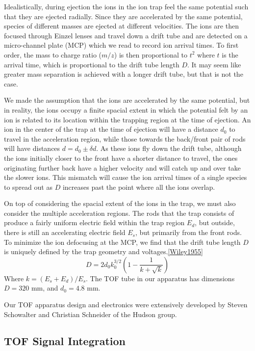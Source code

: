 Idealistically, during ejection the ions in the ion trap feel the same potential such that they are ejected radially. Since they are accelerated by the same potential, species of different masses are ejected at different velocities. The ions are then focused through Einzel lenses and travel down a drift tube and are detected on a micro-channel plate (MCP) which we read to record ion arrival times. To first order, the mass to charge ratio ($m/z$) is then proportional to $t^2$ where $t$ is the arrival time, which is proportional to the drift tube length $D$. It may seem like greater mass separation is achieved with a longer drift tube, but that is not the case.

We made the assumption that the ions are accelerated by the same potential, but in reality, the ions occupy a finite spacial extent in which the potential felt by an ion is related to its location within the trapping region at the time of ejection. An ion in the center of the trap at the time of ejection will have a distance $d_0$ to travel in the acceleration region, while those towards the back/front pair of rods will have distances $d=d_0\pm \delta d$. As these ions fly down the drift tube, although the ions initially closer to the front have a shorter distance to travel, the ones originating further back have a higher velocity and will catch up and over take the slower ions. This mismatch will cause the ion arrival times of a single species to spread out as $D$ increases past the point where all the ions overlap.

On top of considering the spacial extent of the ions in the trap, we must also consider the multiple acceleration regions. The rods that the trap consists of produce a fairly uniform electric field within the trap region $E_d$, but outside, there is still an accelerating electric field $E_s$, but primarily from the front rods. To minimize the ion defocusing at the MCP, we find that the drift tube length $D$ is uniquely defined by the trap geometry and voltages.\ref{Wiley1955}
\begin{equation}
	D = 2d_0 k_0^{3/2}\left(1-\frac{1}{k+\sqrt{k}}\right)
\end{equation}
Where $k = (E_s + E_d)/E_s$. The TOF tube in our apparatus has dimensions $D=320$ mm, and $d_0=4.8$ mm.

Our TOF apparatus design and electronics were extensively developed by Steven Schowalter and Christian Schneider of the Hudson group.\cite{Schowalter2012,Schneider2014}

\subsection{TOF Signal Integration}

